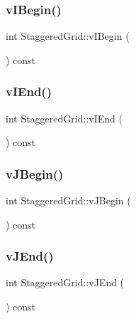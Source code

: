 \mbox{\label{classStaggeredGrid_ace7bf8cb1d279131739d5d12de302d09}} 
\subsubsection{\texorpdfstring{vIBegin()}{vIBegin()}}
{\footnotesize\ttfamily int Staggered\+Grid\+::v\+I\+Begin (\begin{DoxyParamCaption}{ }\end{DoxyParamCaption}) const}

\mbox{\label{classStaggeredGrid_aa5a44aa088b5a7923fa952af1ecb5778}} 
\subsubsection{\texorpdfstring{vIEnd()}{vIEnd()}}
{\footnotesize\ttfamily int Staggered\+Grid\+::v\+I\+End (\begin{DoxyParamCaption}{ }\end{DoxyParamCaption}) const}

\mbox{\label{classStaggeredGrid_a7f8468d672411c0e3a5eeb67788fc826}} 
\subsubsection{\texorpdfstring{vJBegin()}{vJBegin()}}
{\footnotesize\ttfamily int Staggered\+Grid\+::v\+J\+Begin (\begin{DoxyParamCaption}{ }\end{DoxyParamCaption}) const}

\mbox{\label{classStaggeredGrid_ab67e8d9d8d76d34fb02d4d644f0b3795}} 
\subsubsection{\texorpdfstring{vJEnd()}{vJEnd()}}
{\footnotesize\ttfamily int Staggered\+Grid\+::v\+J\+End (\begin{DoxyParamCaption}{ }\end{DoxyParamCaption}) const}

